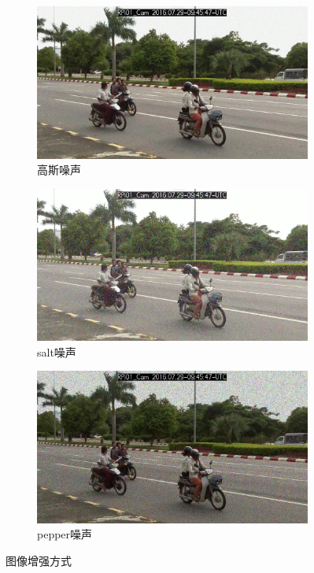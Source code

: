 \begin{figure}[htbp]
    \begin{subfigure}[t]{0.3\textwidth}
        \centering
        \includegraphics[width=\textwidth]{figs/chap03/gn_origin.jpg}
        \caption{高斯噪声}
        \label{fig:sub4}
    \end{subfigure}
    \begin{subfigure}[t]{0.3\textwidth}
        \centering
        \includegraphics[width=\textwidth]{figs/chap03/sn_origin.jpg}
        \caption{salt噪声}
        \label{fig:sub5}
    \end{subfigure}
    \begin{subfigure}[t]{0.3\textwidth}
        \centering
        \includegraphics[width=\textwidth]{figs/chap03/pn_origin.jpg}
        \caption{pepper噪声}
        \label{fig:sub6}
    \end{subfigure}
    \caption{图像增强方式}
    \label{fig:enhance}
\end{figure}

